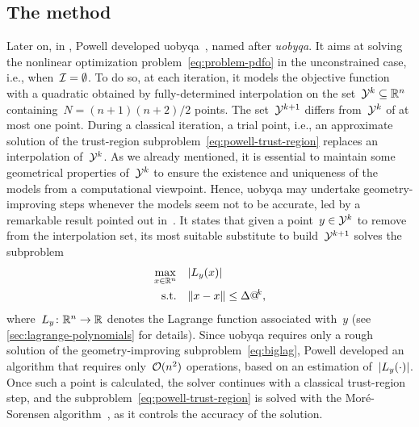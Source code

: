 \subsection{The  method}
\label{subsec:uobyqa}

Later on, in , Powell developed \gls{uobyqa}~\cite{Powell_2002}, named after \emph{\glsdesc{uobyqa}}.
It aims at solving the nonlinear optimization problem~\cref{eq:problem-pdfo} in the unconstrained case, i.e., when~$\mathcal{I} = \emptyset$.
To do so, at each iteration, it models the objective function with a quadratic obtained by fully-determined interpolation on the set~$\xpt[k] \subseteq \R^n$ containing~$N = (n + 1)(n + 2) / 2$ points.
The set~$\xpt[k + 1]$ differs from~$\xpt[k]$ of at most one point.
During a classical iteration, a trial point, i.e., an approximate solution of the trust-region subproblem~\cref{eq:powell-trust-region} replaces an interpolation of~$\xpt[k]$.
As we already mentioned, it is essential to maintain some geometrical properties of~$\xpt[k]$ to ensure the existence and uniqueness of the models from a computational viewpoint.
Hence, \gls{uobyqa} may undertake geometry-improving steps whenever the models seem not to be accurate, led by a remarkable result pointed out in~\cite{Powell_2001}.
It states that given a point~$y \in \xpt[k]$ to remove from the interpolation set, its most suitable substitute to build~$\xpt[k + 1]$ solves the subproblem
\begin{subequations}
    \label{eq:biglag}
    \begin{align}
        \max_{x \in \R^n}   & \quad \abs{\lagp[y](x)}\\
        \text{s.t.}         & \quad \norm{x - \iter} \le \rad[k],
    \end{align}
\end{subequations}
where~$\lagp[y] \colon \R^n \to \R$ denotes the Lagrange function associated with~$y$ (see \cref{sec:lagrange-polynomials} for details).
Since \gls{uobyqa} requires only a rough solution of the geometry-improving subproblem~\cref{eq:biglag}, Powell developed an algorithm that requires only~$\operatorname{\mathcal{O}}(n^2)$ operations, based on an estimation of~$\abs{\lagp[y](\cdot)}$.
Once such a point is calculated, the solver continues with a classical trust-region step, and the subproblem~\cref{eq:powell-trust-region} is solved with the Mor{\'{e}}-Sorensen algorithm~\cite{More_Sorensen_1983}, as it controls the accuracy of the solution.

